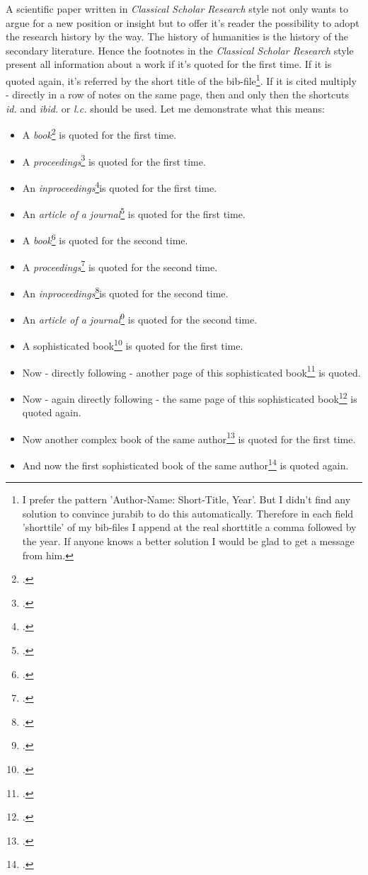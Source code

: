 \documentclass[DIV=calc,BCOR=5mm,11pt,headings=small,oneside,abstract=true, toc=bib]{scrartcl}
\begin{document}
A scientific paper written in \textit{Classical Scholar Research} style not only
wants to argue for a new position or insight but to offer it's reader
the possibility to adopt the research history by the way. The history of
humanities is the history of the secondary literature. Hence the footnotes in
the \textit{Classical Scholar Research} style present all information about a work
if it's quoted for the first time. If it is quoted again, it's referred by the
short title of the bib-file\footnote{I prefer the pattern 'Author-Name:
Short-Title, Year'. But I didn't find any solution to convince jurabib to do
this automatically. Therefore in each field 'shorttile' of my bib-files I append
at the real shorttitle a comma followed by the year. If anyone knows a better
solution I would be glad to get a message from him.}. If it is cited multiply -
directly in a row of notes on the same page, then and only then the shortcuts \textit{id.}
and \textit{ibid.} or \textit{l.c.} should be used. Let me demonstrate what
this means:

\begin{itemize}
  \item A \textit{book}\footcite[cf.][123]{AllHen2008a} is quoted for the first time.
  \item A \textit{proceedings}\footcite[cf.][234]{Brachman1985a} is quoted for the first time.
  \item An \textit{inproceedings}\footcite[cf.][345]{Hays1985a}is quoted for the first time.
  \item An \textit{article of a journal}\footcite[cf.][456]{McCarthy1980a} is quoted for
  the first time.
  \item A \textit{book}\footcite[cf.][123]{AllHen2008a} is quoted for the second time.
  \item A \textit{proceedings}\footcite[cf.][234]{Brachman1985a} is quoted for the second
  time.
  \item An \textit{inproceedings}\footcite[cf.][345]{Hays1985a}is quoted for the
  second time.
  \item An \textit{article of a journal}\footcite[cf.][456]{McCarthy1980a} is quoted for the second time.
  \item A sophisticated book\footcite[cf.][567]{KantKdV1974} is quoted for the first time.
  \item Now - directly following - another page of this sophisticated
  book\footcite[cf.][678]{KantKdV1974} is quoted.
  \item Now - again directly following - the same page of this sophisticated
  book\footcite[cf.][678]{KantKdV1974} is quoted again.
  \item Now another complex book of the same
  author\footcite[cf.][789]{KantKdU1974} is quoted for the first time.
  \item And now the first sophisticated book of the same
  author\footcite[cf.][789]{KantKdV1974} is quoted again.
\end{itemize}
\small




\printnomenclature

\end{document}
